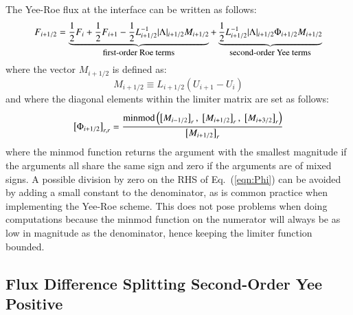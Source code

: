 \documentclass{warpdoc}
\begin{document}
The Yee-Roe flux at the interface can be written as follows:
%
\begin{equation}
F_{i+1/2}=\underbrace{\frac{1}{2} F_i + \frac{1}{2} F_{i+1} 
- \frac{1}{2}L^{-1}_{i+1/2} |\Lambda|_{i+1/2} M_{i+1/2}}_{\textrm{\small first-order~Roe~terms}} 
+ \underbrace{\frac{1}{2}L^{-1}_{i+1/2} |\Lambda|_{i+1/2} \Phi_{i+1/2} M_{i+1/2}}_{\textrm{\small second-order~Yee~terms}} 
\label{eqn:FDS_2o_TVD}
\end{equation}
%
where the vector $M_{i+1/2}$ is defined as: 
%
\begin{equation}
M_{i+1/2} \equiv L_{i+1/2} (U_{i+1}-U_i)
\label{eqn:M}
\end{equation}
%
and where the diagonal elements within the limiter matrix are set as follows:
%
\begin{equation}
\left[\Phi_{i+1/2}\right]_{r,r}=\frac{{\rm minmod}\left( \left[M_{i-1/2}\right]_r, ~ \left[M_{i+1/2}\right]_r, ~\left[M_{i+3/2}\right]_r \right)}{\left[M_{i+1/2}\right]_r}
\label{eqn:Phi}
\end{equation}
%
where the minmod function returns the argument with the smallest magnitude if the arguments all share the same sign and zero if the arguments are of mixed signs. A possible division by zero on the RHS of Eq.\ (\ref{eqn:Phi}) can be avoided by adding a small constant to the denominator, as is common practice when implementing the Yee-Roe scheme. This does not pose problems when doing computations because the minmod function on the numerator will always be as low in magnitude as the denominator, hence keeping the limiter function bounded. 




\subsection{Flux Difference Splitting Second-Order Yee Positive}
\end{document}
